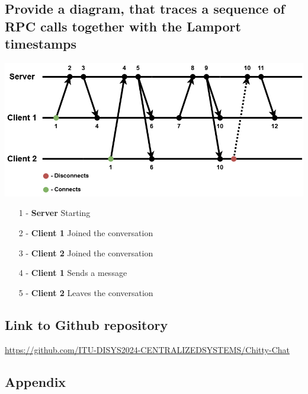 \documentclass[a4paper,11pt]{article}
\begin{document}
\subsection*{Provide a diagram, that traces a sequence of RPC calls together with the Lamport timestamps}
\includegraphics[width=\textwidth]{chat.png}
\begin{center}
\begin{varwidth}{\textwidth}
\begin{enumerate}
    \setlength{\itemsep}{1pt}
    \setlength{\parskip}{0pt}
    \item[1 - \textbf{Server \;}] Starting
    \item[2 - \textbf{Client 1}] Joined the conversation
    \item[3 - \textbf{Client 2}] Joined the conversation
    \item[4 - \textbf{Client 1}] Sends a message
    \item[5 - \textbf{Client 2}] Leaves the conversation
\end{enumerate}
\end{varwidth}
\end{center}
\newpage
\subsection*{Link to Github repository}

\href{https://github.com/ITU-DISYS2024-CENTRALIZEDSYSTEMS/Chitty-Chat}{https://github.com/ITU-DISYS2024-CENTRALIZEDSYSTEMS/Chitty-Chat}

\subsection*{Appendix}
\end{document}
